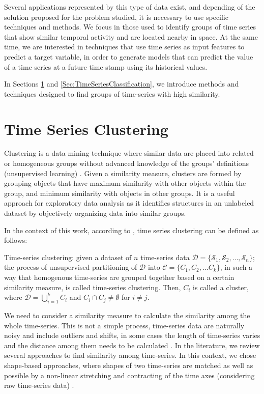Several applications represented by this type of data exist, and depending of the solution proposed for the problem studied, it is necessary to use specific techniques and methods. We focus in those used to identify groups of time series that show similar temporal activity and are located nearby in space. At the same time, we are interested in techniques that use time series as input features to predict a target variable, in order to generate models that can predict the value of a time series at a future time stamp using its historical values.

In Sections \ref{Sec:TimeSeriesClustering} and \ref{Sec:TimeSeriesClassification}, we introduce methods and techniques designed to find groups of time-series with high similarity. 

\section{Time Series Clustering}
\label{Sec:TimeSeriesClustering}

Clustering is a data mining technique where similar data are placed into related or homogeneous groups without advanced knowledge of the groups' definitions (unsupervised learning) \cite{HastieTF2009}. Given a similarity measure, clusters are formed by grouping objects that have maximum similarity with other objects within the group, and minimum similarity with objects in other groups. It is a useful approach for exploratory data analysis as it identifies structures in an unlabeled dataset by objectively organizing data into similar groups.

In the context of this work, according to \cite{Aghabozorgi2015}, time series clustering can be defined as follows:

\begin{definition} Time-series clustering: given a dataset of $n$ time-series data $\mathcal{D} = \{\mathcal{S}_1, \mathcal{S}_2, \ldots, \mathcal{S}_n\}$; the process of unsupervised partitioning of $\mathcal{D}$ into $\mathcal{C} = \{C_1, C_2, \ldots C_k\}$, in such a way
that homogenous time-series are grouped together based on a certain similarity measure, is called time-series clustering. Then, $C_i$ is called a cluster, where $\mathcal{D} = \bigcup_{i=1}^{k} C_{i}$ and $C_i \cap C_j \neq \emptyset$ for $i \neq j$.
\end{definition}

We need to consider a similarity measure to calculate the similarity among the whole time-series. This is not a simple process, time-series data are naturally noisy and include outliers and shifts, in some cases the length of time-series varies and the distance among them needs to be calculated \cite{Liao2005}. In the literature, we review several approaches to find similarity among time-series. In this context, we chose shape-based approaches, where shapes of two time-series are matched as well as possible by a non-linear stretching and contracting of the time axes (considering raw time-series data) \cite{Meesrikamolkul2012}.

